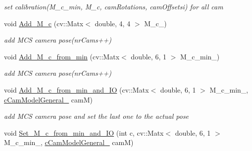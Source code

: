 \begin{DoxyCompactItemize}
\begin{DoxyCompactList}\small\item\em set calibration(\+M\+\_\+c\+\_\+min, M\+\_\+c, cam\+Rotations, cam\+Offsetsi) for all cam \end{DoxyCompactList}\item 
void \hyperlink{classMultiColSLAM_1_1cMultiCamSys___af7af083b06c487bb6383d77ea09b41ba}{Add\+\_\+\+M\+\_\+c} (cv\+::\+Matx$<$ double, 4, 4 $>$ M\+\_\+c\+\_\+)\hypertarget{classMultiColSLAM_1_1cMultiCamSys___af7af083b06c487bb6383d77ea09b41ba}{}\label{classMultiColSLAM_1_1cMultiCamSys___af7af083b06c487bb6383d77ea09b41ba}

\begin{DoxyCompactList}\small\item\em add M\+CS camera pose(nr\+Cams++) \end{DoxyCompactList}\item 
void \hyperlink{classMultiColSLAM_1_1cMultiCamSys___aef2b4de35eccc1ed3948568efa3cdada}{Add\+\_\+\+M\+\_\+c\+\_\+from\+\_\+min} (cv\+::\+Matx$<$ double, 6, 1 $>$ M\+\_\+c\+\_\+min\+\_\+)\hypertarget{classMultiColSLAM_1_1cMultiCamSys___aef2b4de35eccc1ed3948568efa3cdada}{}\label{classMultiColSLAM_1_1cMultiCamSys___aef2b4de35eccc1ed3948568efa3cdada}

\begin{DoxyCompactList}\small\item\em add M\+CS camera pose(nr\+Cams++) \end{DoxyCompactList}\item 
void \hyperlink{classMultiColSLAM_1_1cMultiCamSys___a0dff9ed09343e4b39441683477709e2b}{Add\+\_\+\+M\+\_\+c\+\_\+from\+\_\+min\+\_\+and\+\_\+\+IO} (cv\+::\+Matx$<$ double, 6, 1 $>$ M\+\_\+c\+\_\+min\+\_\+, \hyperlink{classMultiColSLAM_1_1cCamModelGeneral__}{c\+Cam\+Model\+General\+\_\+} camM)\hypertarget{classMultiColSLAM_1_1cMultiCamSys___a0dff9ed09343e4b39441683477709e2b}{}\label{classMultiColSLAM_1_1cMultiCamSys___a0dff9ed09343e4b39441683477709e2b}

\begin{DoxyCompactList}\small\item\em add M\+CS camera pose and set the last one to the actual pose \end{DoxyCompactList}\item 
void \hyperlink{classMultiColSLAM_1_1cMultiCamSys___a70f5bf5167933561ffde33350312509b}{Set\+\_\+\+M\+\_\+c\+\_\+from\+\_\+min\+\_\+and\+\_\+\+IO} (int c, cv\+::\+Matx$<$ double, 6, 1 $>$ M\+\_\+c\+\_\+min\+\_\+, \hyperlink{classMultiColSLAM_1_1cCamModelGeneral__}{c\+Cam\+Model\+General\+\_\+} camM)\hypertarget{classMultiColSLAM_1_1cMultiCamSys___a70f5bf5167933561ffde33350312509b}{}\label{classMultiColSLAM_1_1cMultiCamSys___a70f5bf5167933561ffde33350312509b}


\end{DoxyCompactItemize}
